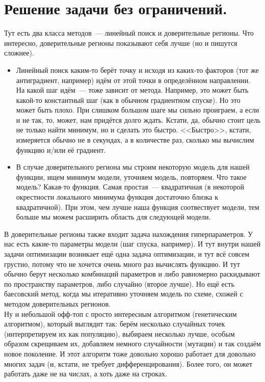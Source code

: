 \documentclass{article}
\begin{document}
    \section{Решение задачи без ограничений.}
    Тут есть два класса методов~--- линейный поиск и доверительные регионы. Что интересно, доверительные регионы показывают себя лучше (но и пишутся сложнее).
    \begin{itemize}
        \item Линейный поиск каким-то берёт точку и исходя из каких-то факторов (тот же антиградиент, например) идём от этой точки в определённом направлении. На какой шаг идём~--- тоже зависит от метода. Например, это может быть какой-то константный шаг (как в обычном градиентном спуске). Но это может быть плохо. При слишком большом шаге мы сильно проиграем, а если и не так, то, может, нам придётся долго ждать. Кстати, да, обычно стоит цель не только найти минимум, но и сделать это быстро. <<Быстро>>, кстати, измеряется обычно не в секундах, а в количестве раз, сколько мы вычислим функцию и/или её градиент.
        \item В случае доверительного региона мы строим некоторую модель для нашей функции, ищем минимум модели, уточняем модель, повторяем. Что такое модель? Какая-то функция. Самая простая~--- квадратичная (в некоторой окрестности локального минимума функция достаточно близка к квадратичной). При этом, чем лучше наша функция соотвествует модели, тем больше мы можем расширить область для следующей модели.
    \end{itemize}
    В доверительные регионы также входит задача нахождения гиперпараметров. У нас есть какие-то параметры модели (шаг спуска, например). И тут внутри нашей задачи оптимизации возникает ещё одна задача оптимизации, и тут всё совсем грустно, потому что не хочется очень много раз вычислять функцию. И тут обычно берут несколько комбинаций параметров и либо равномерно раскидывают по пространству параметров, либо случайно (второе лучше). Но ещё есть баесовский метод, когда мы итеративно уточняем модель по схеме, схожей с методом доверительных регионов.\\
    Ну и небольшой офф-топ с просто интересным алгоритмом (генетическим алгоритмом), который выглядит так: берём несколько случайных точек (интерпретируем их как популяцию), выбираем несколько лучше, особым образом скрещиваем их, добавляем немного случайности (мутации) и так создаём новое поколение. И этот алгоритм тоже довольно хорошо работает для довольно многих задач (и, кстати, не требует дифференцирования). Более того, он может работать даже не на числах, а хоть даже на строках.
\end{document}
